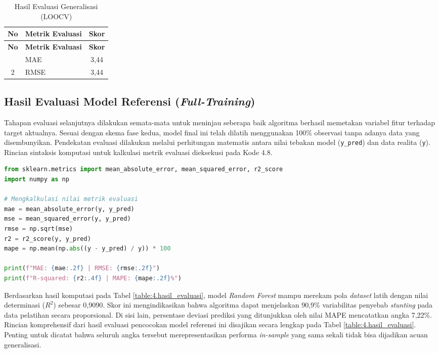 \begin{longtable}{|c|p{}|c|}
    \caption{Hasil Evaluasi Generalisasi (LOOCV)}
    \label{table:4.hasil_loocv}\\
    \hline
    \textbf{No} & \multicolumn{1}{c|}{\textbf{Metrik Evaluasi}} & \textbf{Skor} \tabularnewline 
    \hline
    \endfirsthead
    \hline
    \textbf{No} & \multicolumn{1}{c|}{\textbf{Metrik Evaluasi}} & \textbf{Skor} \tabularnewline 
    \hline
    \endhead
    \hline
    \endfoot
    \hline
    \endlastfoot
    1 & MAE & 3,44 \tabularnewline 
    \hline
    2 & RMSE & 3,44 \tabularnewline
    \hline
\end{longtable}

\subsection{Hasil Evaluasi Model Referensi (\textit{Full-Training})}
Tahapan evaluasi selanjutnya dilakukan semata-mata untuk meninjau seberapa baik algoritma berhasil memetakan variabel fitur terhadap target aktualnya. Sesuai dengan skema fase kedua, model final ini telah dilatih menggunakan 100\% observasi tanpa adanya data yang disembunyikan. Pendekatan evaluasi dilakukan melalui perhitungan matematis antara nilai tebakan model (\texttt{y\_pred}) dan data realita (\texttt{y}). Rincian sintaksis komputasi untuk kalkulasi metrik evaluasi dieksekusi pada Kode 4.8.

\begin{lstlisting}[language=Python, caption={Perhitungan Metrik Evaluasi Regresi}, label={code:evaluasi}, frame=single, basicstyle=\ttfamily\scriptsize, breaklines=true]
from sklearn.metrics import mean_absolute_error, mean_squared_error, r2_score
import numpy as np

# Mengkalkulasi nilai metrik evaluasi
mae = mean_absolute_error(y, y_pred)
mse = mean_squared_error(y, y_pred)
rmse = np.sqrt(mse)
r2 = r2_score(y, y_pred)
mape = np.mean(np.abs((y - y_pred) / y)) * 100

print(f"MAE: {mae:.2f} | RMSE: {rmse:.2f}")
print(f"R-squared: {r2:.4f} | MAPE: {mape:.2f}%")
\end{lstlisting}

Berdasarkan hasil komputasi pada Tabel \ref{table:4.hasil_evaluasi}, model \textit{Random Forest} mampu merekam pola \textit{dataset} latih dengan nilai determinasi ($R^2$) sebesar 0,9090. Skor ini mengindikasikan bahwa algoritma dapat menjelaskan 90,9\% variabilitas penyebab \textit{stunting} pada data pelatihan secara proporsional. Di sisi lain, persentase deviasi prediksi yang ditunjukkan oleh nilai MAPE mencatatkan angka 7,22\%. Rincian komprehensif dari hasil evaluasi pencocokan model referensi ini disajikan secara lengkap pada Tabel \ref{table:4.hasil_evaluasi}. Penting untuk dicatat bahwa seluruh angka tersebut merepresentasikan performa \textit{in-sample} yang sama sekali tidak bisa dijadikan acuan generalisasi.

